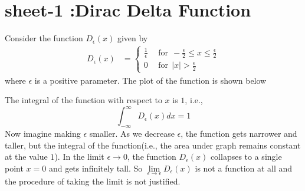 \chapter{sheet-1 :Dirac Delta Function}
	Consider the function $D_\epsilon(x)$ given by
	\begin{eqnarray}
	D_\epsilon(x) &= 
		\begin{cases}
			\frac{1}{\epsilon} \ \ &\text{for} \ \  -\frac{\epsilon}{2} \leq x \leq \frac{\epsilon}{2} \\
			0 \ \ &\text{for} \ \  |x| > \frac{\epsilon}{2} 
		\end{cases}
	\end{eqnarray}
	where $\epsilon$ is a positive parameter. The plot of the function is shown below
	
	
	
	The integral of the function with respect to $x$ is $1$, i.e.,
	\begin{equation}
		\int_{-\infty}^{\infty} D_\epsilon(x) dx = 1
	\end{equation}
	Now imagine making $\epsilon$ smaller. As we decrease $\epsilon$, the function gets narrower and taller, but the integral of the function(i.e., the area under graph remains constant at the value $1$).
	In the limit $\epsilon \rightarrow 0$, the function $D_\epsilon(x)$ collapses to a single  point $x=0$ and gets infinitely tall. So $\lim\limits_{\epsilon \rightarrow \epsilon} D_\epsilon(x)$ is not a function at all and the procedure of taking the limit is not justified.
	\\
	
